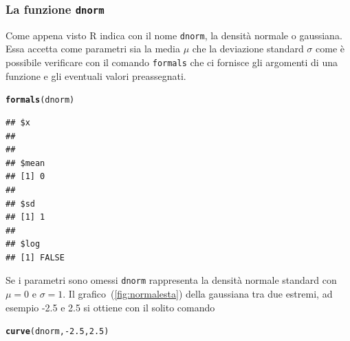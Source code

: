 \documentclass[onecolumn,12pt]{book}\usepackage[]{graphicx}\usepackage[]{color}
\makeatletter
\newcommand{\hlnum}[1]{\textcolor[rgb]{0.686,0.059,0.569}{#1}}%
\newcommand{\hlopt}[1]{\textcolor[rgb]{0,0,0}{#1}}%
\newcommand{\hlstd}[1]{\textcolor[rgb]{0.345,0.345,0.345}{#1}}%
\newcommand{\hlkwd}[1]{\textcolor[rgb]{0.737,0.353,0.396}{\textbf{#1}}}%
\newenvironment{kframe}{%
 \def\at@end@of@kframe{}%
 \ifinner\ifhmode%
  \def\at@end@of@kframe{\end{minipage}}%
  \begin{minipage}{\columnwidth}%
 \fi\fi%
 \def\FrameCommand##1{\hskip\@totalleftmargin \hskip-\fboxsep
 \colorbox{shadecolor}{##1}\hskip-\fboxsep
     \hskip-\linewidth \hskip-\@totalleftmargin \hskip\columnwidth}%
 \MakeFramed {\advance\hsize-\width
   \@totalleftmargin\z@ \linewidth\hsize
   \@setminipage}}%
 {\par\unskip\endMakeFramed%
 \at@end@of@kframe}
\newenvironment{knitrout}{}{} %
\makeatother
\begin{document}
\subsubsection{La funzione \texttt{dnorm}}
Come appena visto \textsf{R }indica con il nome \texttt{dnorm}, la densit\`a normale o gaussiana. Essa accetta come parametri sia la media $\mu$ che la deviazione standard $\sigma$ come \`e possibile verificare con il comando \texttt{formals} che ci fornisce gli argomenti di una funzione e gli eventuali valori preassegnati.
\begin{knitrout}
\color{fgcolor}\begin{kframe}
\begin{alltt}
\hlkwd{formals}\hlstd{(dnorm)}
\end{alltt}
\begin{verbatim}
## $x
## 
## 
## $mean
## [1] 0
## 
## $sd
## [1] 1
## 
## $log
## [1] FALSE
\end{verbatim}
\end{kframe}
\end{knitrout}
Se i parametri sono omessi \texttt{dnorm} rappresenta la densit\`a normale standard con $\mu=0$ e $\sigma=1$.
Il grafico~(\ref{fig:normalesta}) della gaussiana
 tra due estremi, ad esempio -2.5 e 2.5 si ottiene con il solito comando
\begin{knitrout}
\color{fgcolor}\begin{kframe}
\begin{alltt}
\hlkwd{curve}\hlstd{(dnorm,}\hlopt{-}\hlnum{2.5}\hlstd{,}\hlnum{2.5}\hlstd{)}
\end{alltt}


{\ttfamily\noindent\bfseries\color{errorcolor}{\#\# Error in getMetricsFromLatex(TeXMetrics, verbose = verbose): \\\#\# TeX was unable to calculate metrics for the following string\\\#\# or character:\\\#\# \\\#\# 	m\\\#\# \\\#\# Common reasons for failure include:\\\#\#\ \  * The string contains a character which is special to LaTeX unless\\\#\#\ \ \ \  escaped properly, such as \% or \$.\\\#\#\ \  * The string makes use of LaTeX commands provided by a package and\\\#\#\ \ \ \  the tikzDevice was not told to load the package.\\\#\# \\\#\# The contents of the LaTeX log of the aborted run have been printed above,\\\#\# it may contain additional details as to why the metric calculation failed.}}\end{kframe}
\end{knitrout}
\end{document}
